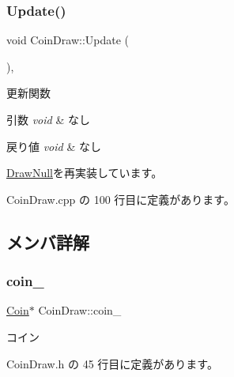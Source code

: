 \subsubsection{\texorpdfstring{Update()}{Update()}}
{\footnotesize\ttfamily void Coin\+Draw\+::\+Update (\begin{DoxyParamCaption}{ }\end{DoxyParamCaption})\hspace{0.3cm}{\ttfamily [override]}, {\ttfamily [virtual]}}



更新関数 


\begin{DoxyParams}{引数}
{\em void} & なし \\
\hline
\end{DoxyParams}

\begin{DoxyRetVals}{戻り値}
{\em void} & なし \\
\hline
\end{DoxyRetVals}


\mbox{\hyperlink{class_draw_null_ad32a508d269de7eda8ad24ea72230464}{Draw\+Null}}を再実装しています。



 Coin\+Draw.\+cpp の 100 行目に定義があります。



\subsection{メンバ詳解}
\mbox{\label{class_coin_draw_a62baab6b1a22df45ce4c81970f4a38f4}} 
\subsubsection{\texorpdfstring{coin\+\_\+}{coin\_}}
{\footnotesize\ttfamily \mbox{\hyperlink{class_coin}{Coin}}$\ast$ Coin\+Draw\+::coin\+\_\+\hspace{0.3cm}{\ttfamily [private]}}



コイン 



 Coin\+Draw.\+h の 45 行目に定義があります。

\mbox{\label{class_coin_draw_a3276c57dc391b0355fb1575e7399afe5}} 
